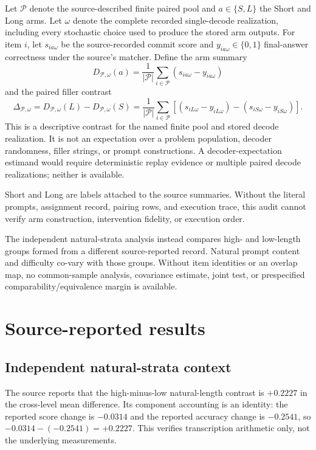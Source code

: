 \documentclass{article}
\newcommand{\crossdiff}{D}
\begin{document}
Let $\mathcal P$ denote the source-described finite paired pool and
$a\in\{S,L\}$ the Short and Long arms.  Let $\omega$ denote the complete recorded
single-decode realization, including every stochastic choice used to produce the stored
arm outputs.  For item $i$, let $s_{ia\omega}$ be the source-recorded commit score and
$y_{ia\omega}\in\{0,1\}$ final-answer correctness under the source's matcher.  Define
the arm summary
\[
 \crossdiff_{\mathcal P,\omega}(a)
 = \frac{1}{|\mathcal P|}\sum_{i\in\mathcal P}
   \left(s_{ia\omega}-y_{ia\omega}\right)
\]
and the paired filler contrast
\[
 \Delta_{\mathcal P,\omega}
 = \crossdiff_{\mathcal P,\omega}(L)-\crossdiff_{\mathcal P,\omega}(S)
 = \frac{1}{|\mathcal P|}\sum_{i\in\mathcal P}
 \left[(s_{iL\omega}-y_{iL\omega})-(s_{iS\omega}-y_{iS\omega})\right].
 \label{eq:recorded-estimand}
\]
This is a descriptive contrast for the named finite pool and stored decode realization.
It is not an expectation over a problem population, decoder randomness, filler strings,
or prompt constructions.  A decoder-expectation estimand would require deterministic
replay evidence or multiple paired decode realizations; neither is available.

Short and Long are labels attached to the source summaries.  Without the literal
prompts, assignment record, pairing rows, and execution trace, this audit cannot verify
arm construction, intervention fidelity, or execution order.

The independent natural-strata analysis instead compares high- and low-length groups
formed from a different source-reported record.  Natural prompt content and difficulty
co-vary with those groups.  Without item identities or an overlap map, no common-sample
analysis, covariance estimate, joint test, or prespecified comparability/equivalence
margin is available.

\section{Source-reported results}
\label{sec:results}

\subsection{Independent natural-strata context}

The source reports that the high-minus-low natural-length contrast is $+0.2227$ in the
cross-level mean difference.  Its component accounting is an identity: the reported
score change is $-0.0314$ and the reported accuracy change is $-0.2541$, so
$-0.0314-(-0.2541)=+0.2227$.  This verifies transcription arithmetic only, not the
underlying measurements.
\end{document}

